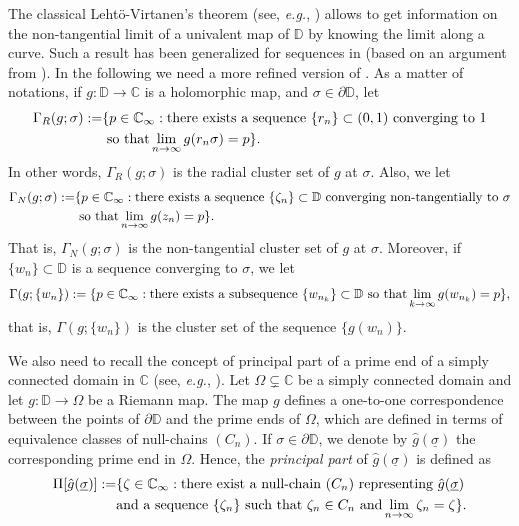\documentclass[12pt]{amsart}
\theoremstyle{definition}
\theoremstyle{remark}
\numberwithin{equation}{section}
\def\C{\mathbb C}
\def\D{\mathbb D}
\begin{document}
The classical Leht\"o-Virtanen's theorem {(see, {\sl e.g.}, \cite[Theorem 3.3.1]{BCDM})} allows to get information on the non-tangential limit of a univalent map of $\D$ by knowing the limit along a curve. Such a result has been generalized   for sequences in \cite[Lemma 5.4]{BB}  (based on an argument from \cite[Theorem 1.5]{AB}). In the following we need a more refined version of \cite[Lemma 5.4]{BB}. As a matter of notations, if $g:\D\to \C$ is a holomorphic map, and $\sigma\in\partial\D$, let
\begin{equation*}
\begin{split}
\Gamma_{R}(g;\sigma):=&\{p\in \C_\infty: \hbox{there exists a sequence $\{r_n\}\subset(0,1)$  converging  to $1$}\\&\hbox{ so that} \lim_{n\to \infty}g(r_n\sigma)=p\}.
\end{split}
\end{equation*}
In other words, $\Gamma_{R}(g;\sigma)$ is the radial cluster set of $g$ at $\sigma$.  Also, we let
\begin{equation*}
\begin{split}
\Gamma_{N}(g;\sigma):=&\{p\in \C_\infty: \hbox{there exists a sequence $\{\zeta_n\}\subset\D$  converging non-tangentially to $\sigma$}\\&\hbox{ so that} \lim_{n\to \infty}g(z_n)=p\}.
\end{split}
\end{equation*}
That is, $\Gamma_{N}(g;\sigma)$ is the non-tangential cluster set of $g$ at $\sigma$. Moreover, if $\{w_n\}\subset\D$ is a sequence converging to $\sigma$, we let 
\[
\Gamma(g;\{w_n\}):=\{p\in \C_\infty: \hbox{there exists a subsequence $\{w_{n_k}\}\subset\D$ so that} \lim_{k\to \infty}g(w_{n_k})=p\},
\]
that is, $\Gamma(g;\{w_n\})$ is the cluster set of the sequence $\{g(w_n)\}$. 

We also need to recall the concept of  principal part of a prime end of a simply connected domain in $\C$ (see, {\sl e.g.}, \cite[Chapter~4]{BCDM}). Let $\Omega\subsetneq \C$ be a simply connected domain and let $g:\D\to \Omega$ be a Riemann map. The map $g$ defines  a one-to-one correspondence between the points of $\partial\D$ and the prime ends of $\Omega$, which are defined in terms of equivalence classes of null-chains $(C_n)$. If $\sigma\in \partial \D$, we denote by $\hat{g}(\underline{\sigma})$ the corresponding prime end in $\Omega$. Hence, the {\sl principal part} of $\hat{g}(\underline{\sigma})$ is defined as
\begin{equation*}
\begin{split}
 \Pi[\hat{g}(\underline{\sigma})]:=&\{\zeta\in\C_\infty:\hbox{there exist a null-chain $(C_n)$ representing $\hat{g}(\underline{\sigma})$}\\& \hbox{and a sequence $\{\zeta_n\}$ such that } \zeta_n\in C_n \hbox{ and} \lim_{n\to \infty}\zeta_n=\zeta\}. 
\end{split}
\end{equation*}
\end{document}
